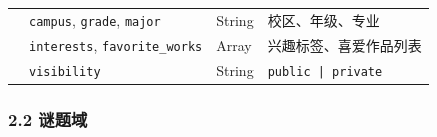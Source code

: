 \documentclass[a4paper,12pt]{article}
\begin{document}
\begin{table}[H]
{\begin{tabular}{p{2.8cm} p{3.2cm} p{2.2cm} p{5.5cm}}
                                                & \texttt{campus}, \texttt{grade}, \texttt{major}                                                    & String         & 校区、年级、专业                                                                                                            \\
                                                & \texttt{interests}, \texttt{favorite\_works}                                                       & Array          & 兴趣标签、喜爱作品列表                                                                                                         \\
                                                & \texttt{visibility}                                                                                & String         & \texttt{public | private}                                                                                           \\
      \bottomrule
    \end{tabular}}
\end{table}

\subsubsection*{2.2 谜题域}
\end{document}
